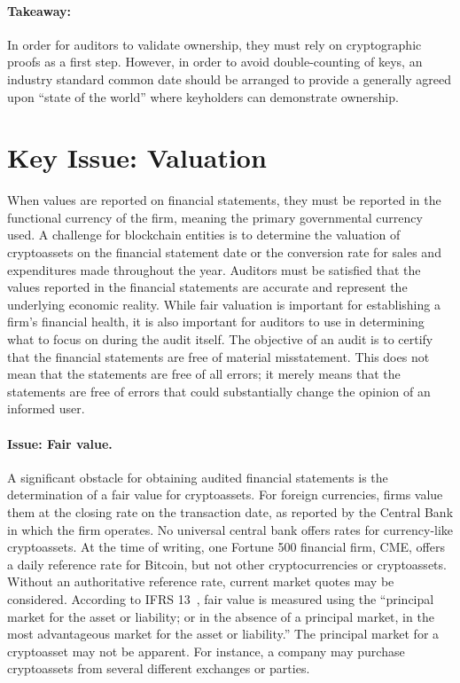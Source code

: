\paragraph{Takeaway:} In order for auditors to validate ownership, they must rely on cryptographic proofs as a first step. However, in order to avoid double-counting of keys, an industry standard common date should be arranged to provide a generally agreed upon ``state of the world'' where keyholders can demonstrate ownership. 

\section{Key Issue: Valuation}
When values are reported on financial statements, they must be reported in the functional currency of the firm, meaning the primary governmental currency used. A challenge for blockchain entities is to determine the valuation of cryptoassets on the financial statement date or the conversion rate for sales and expenditures made throughout the year. Auditors must be satisfied that the values reported in the financial statements are accurate and represent the underlying economic reality. While fair valuation is important for establishing a firm{'}s financial health, it is also important for auditors to use in determining what to focus on during the audit itself. The objective of an audit is to certify that the financial statements are free of material misstatement. This does not mean that the statements are free of all errors; it merely means that the statements are free of errors that could substantially change the opinion of an informed user. 

\paragraph{Issue: Fair value.} A significant obstacle for obtaining audited financial statements is the determination of a fair value for cryptoassets. For foreign currencies, firms value them at the closing rate on the transaction date, as reported by the Central Bank in which the firm operates. No universal central bank offers rates for currency-like cryptoassets. At the time of writing, one Fortune 500 financial firm, CME, offers a daily reference rate for Bitcoin, but not other cryptocurrencies or cryptoassets. Without an authoritative reference rate, current market quotes may be considered. According to IFRS 13~\cite{ifrs201113}, fair value is measured using the ``principal market for the asset or liability; or in the absence of a principal market, in the most advantageous market for the asset or liability.'' The principal market for a cryptoasset may not be apparent. For instance, a company may purchase cryptoassets from several different exchanges or parties. 

